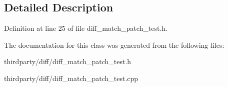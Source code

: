 \subsection{Detailed Description}


Definition at line 25 of file diff\+\_\+match\+\_\+patch\+\_\+test.\+h.



The documentation for this class was generated from the following files\+:\begin{DoxyCompactItemize}
\item 
thirdparty/diff/diff\+\_\+match\+\_\+patch\+\_\+test.\+h\item 
thirdparty/diff/diff\+\_\+match\+\_\+patch\+\_\+test.\+cpp\end{DoxyCompactItemize}
